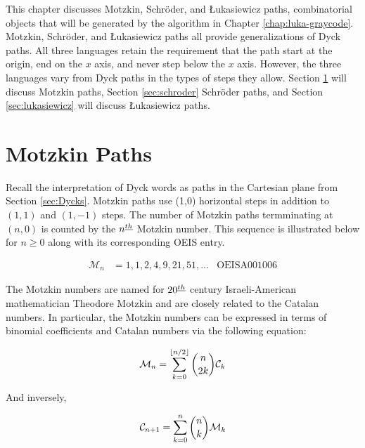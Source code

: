 
This chapter discusses Motzkin, Schröder, and Łukasiewicz paths, combinatorial objects that will be generated by the algorithm in Chapter \ref{chap:luka-graycode}.
Motzkin, Schröder, and Łukasiewicz paths all provide generalizations of Dyck paths.  
All three languages retain the requirement that the path start at the origin, end on the $x$ axis, and never step below the $x$ axis.  However, the three languages vary from Dyck paths in the types of steps they allow.  Section \ref{sec:motzkin} will discuss Motzkin paths, Section \ref{sec:schroder} Schröder paths, and Section \ref{sec:lukasiewicz} will discuss Łukasiewicz paths.

\section{Motzkin Paths}\label{sec:motzkin}
Recall the interpretation of Dyck words as paths in the Cartesian plane from Section \ref{sec:Dycks}.
Motzkin paths use (1,0) horizontal steps in addition to $(1,1)$ and $(1,-1)$ steps. 
The number of Motzkin paths termminating at $(n,0)$ is counted by the $n^{\underline{th}}$ Motzkin number.  This sequence is illustrated below for $n \ge 0$ along with its corresponding OEIS entry.


\begin{align}
\mathcal{M}_n &= 1, 1, 2, 4, 9, 21, 51, \ldots  & \text{OEIS} \text{A}001006
\end{align}

The Motzkin numbers are named for $20^{\underline{th}}$ century Israeli-American mathematician Theodore Motzkin and are closely related to the Catalan numbers.  In particular, the Motzkin numbers can be expressed in terms of binomial coefficients and Catalan numbers via the following equation:

\begin{equation}
	\mathcal{M}_n = \sum_{k=0}^{\lfloor n/2 \rfloor} {n \choose 2k}\mathcal{C}_k
\end{equation}

And inversely, 

\begin{equation}
	\mathcal{C}_{n+1} = \sum_{k=0}^{n} {n \choose k}\mathcal{M}_k
\end{equation}


